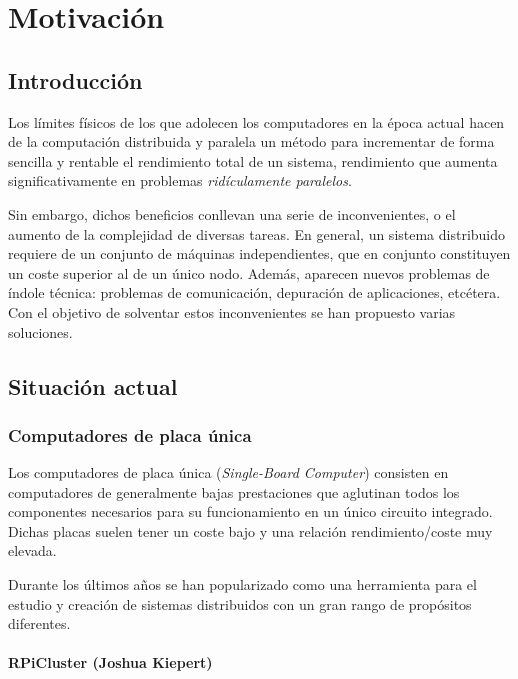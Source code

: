 \chapter{Motivación}

\section{Introducción}

Los límites físicos de los que adolecen los computadores en la época actual hacen de la computación distribuida y paralela un método para incrementar de forma sencilla y rentable el rendimiento total de un sistema, rendimiento que aumenta significativamente en problemas \textit{ridículamente paralelos}\citationneeded.

Sin embargo, dichos beneficios conllevan una serie de inconvenientes, o el aumento de la complejidad de diversas tareas. En general, un sistema distribuido requiere de un conjunto de máquinas independientes, que en conjunto constituyen un coste superior al de un único nodo. Además, aparecen nuevos problemas de índole técnica: problemas de comunicación, depuración de aplicaciones, etcétera. Con el objetivo de solventar estos inconvenientes se han propuesto varias soluciones.

\section{Situación actual}

\subsection{Computadores de placa única}

Los computadores de placa única (\textit{Single-Board Computer}) consisten en computadores de generalmente bajas prestaciones que aglutinan todos los componentes necesarios para su funcionamiento en un único circuito integrado. Dichas placas suelen tener un coste bajo y una relación rendimiento/coste muy elevada.

Durante los últimos años se han popularizado como una herramienta para el estudio y creación de sistemas distribuidos con un gran rango de propósitos diferentes.

\subsubsection{RPiCluster (Joshua Kiepert)}


